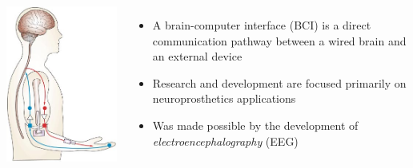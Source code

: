 \documentclass{beamer}
\begin{document}
\begin{frame}
	\begin{columns}
		\includegraphics[scale=.55]{Neural_Interface_prosthetic}
		\begin{itemize}
			\item A brain-computer interface (BCI) is a direct communication pathway between a wired brain and an external device
			\item Research and development are focused primarily on neuroprosthetics applications
			\item Was made possible by the development of \emph{electroencephalography} (EEG)
		\end{itemize}
	\end{columns}
\end{frame}
\end{document}
